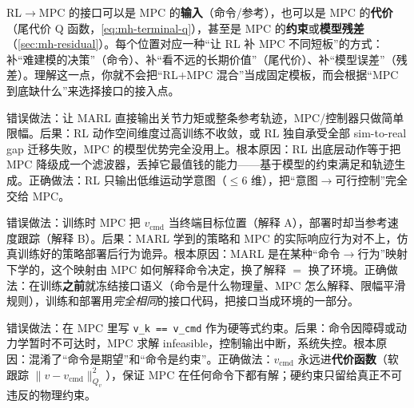 \begin{insight}
RL$\to$MPC 的接口可以是 MPC 的\textbf{输入}（命令/参考），也可以是 MPC 的\textbf{代价}（尾代价 Q 函数，\cref{eq:mh-terminal-q}），甚至是 MPC 的\textbf{约束}或\textbf{模型残差}（\cref{sec:mh-residual}）。每个位置对应一种“让 RL 补 MPC 不同短板”的方式：补“难建模的决策”（命令）、补“看不远的长期价值”（尾代价）、补“模型误差”（残差）。理解这一点，你就不会把“RL$+$MPC 混合”当成固定模板，而会根据“MPC 到底缺什么”来选择接口的接入点。
\end{insight}

\begin{pitfall}
错误做法：让 MARL 直接输出关节力矩或整条参考轨迹，MPC/控制器只做简单限幅。后果：RL 动作空间维度过高训练不收敛，或 RL 独自承受全部 sim-to-real gap 迁移失败，MPC 的模型优势完全没用上。根本原因：RL 出底层动作等于把 MPC 降级成一个滤波器，丢掉它最值钱的能力——基于模型的约束满足和轨迹生成。正确做法：RL 只输出低维运动学意图（$\le 6$ 维），把“意图$\to$可行控制”完全交给 MPC。
\end{pitfall}

\begin{pitfall}
错误做法：训练时 MPC 把 $v_{\text{cmd}}$ 当终端目标位置（解释 A），部署时却当参考速度跟踪（解释 B）。后果：MARL 学到的策略和 MPC 的实际响应行为对不上，仿真训练好的策略部署后行为诡异。根本原因：MARL 是在某种“命令$\to$行为”映射下学的，这个映射由 MPC 如何解释命令决定，换了解释 $=$ 换了环境。正确做法：在训练\textbf{之前}就冻结接口语义（命令是什么物理量、MPC 怎么解释、限幅平滑规则），训练和部署用\emph{完全相同}的接口代码，把接口当成环境的一部分。
\end{pitfall}

\begin{pitfall}
错误做法：在 MPC 里写 \texttt{v\_k == v\_cmd} 作为硬等式约束。后果：命令因障碍或动力学暂时不可达时，MPC 求解 infeasible，控制输出中断，系统失控。根本原因：混淆了“命令是期望”和“命令是约束”。正确做法：$v_{\text{cmd}}$ 永远进\textbf{代价函数}（软跟踪 $\|v-v_{\text{cmd}}\|^2_{Q_v}$），保证 MPC 在任何命令下都有解；硬约束只留给真正不可违反的物理约束。
\end{pitfall}

